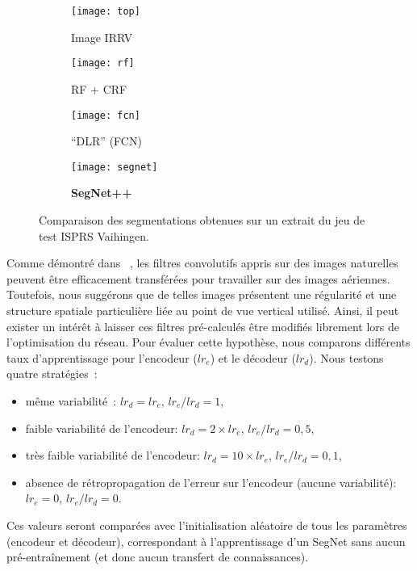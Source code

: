 \begin{figure}[t]
  \centering
  \captionsetup[subfigure]{singlelinecheck=off,justification=centering}
  \captionsetup[subfigure]{labelformat=empty}
  \begin{subfigure}[t]{0.19\textwidth}
    \texttt{[image: top]}
    \caption{Image IRRV}
  \end{subfigure}
    \begin{subfigure}[t]{0.19\textwidth}
    \texttt{[image: rf]}
    \caption{RF + CRF\cite{quang_efficient_2015}}
  \end{subfigure}
    \begin{subfigure}[t]{0.19\textwidth}
    \texttt{[image: fcn]}
    \caption{``DLR'' (FCN)\cite{marmanis_semantic_2016}}
  \end{subfigure}
    \begin{subfigure}[t]{0.19\textwidth}
    \texttt{[image: segnet]}
    \caption{\textbf{SegNet++}}
  \end{subfigure}
  \caption{Comparaison des segmentations obtenues sur un extrait du jeu de test ISPRS Vaihingen.\\
  \isprslegende}
  \label{fig_segnet_qualitative}
\end{figure}

Comme démontré dans ~\cite{penatti_deep_2015}, les filtres convolutifs appris sur des images naturelles peuvent être efficacement transférées pour travailler sur des images aériennes. Toutefois, nous suggérons que de telles images présentent une régularité et une structure spatiale particulière liée au point de vue vertical utilisé. Ainsi, il peut exister un intérêt à laisser ces filtres pré-calculés être modifiés librement lors de l'optimisation du réseau. Pour évaluer cette hypothèse, nous comparons différents taux d'apprentissage pour l'encodeur ($lr_{e}$) et le décodeur ($lr_{d}$). Nous testons quatre stratégies~:
\begin{itemize}
  \item même variabilité~: $lr_{d} = lr_{e}$, ${lr_{e} / lr_{d}} = 1$,
  \item faible variabilité de l'encodeur: $lr_{d} = 2 \times lr_{e}$, ${lr_{e} / lr_{d}} = 0,5$,
  \item très faible variabilité de l'encodeur: $lr_{d} = 10 \times lr_{e}$, ${lr_{e} / lr_{d}} = 0,1$,
  \item absence de rétropropagation de l'erreur sur l'encodeur (aucune variabilité): $lr_{e} = 0$, ${lr_{e} / lr_{d}} = 0$.
\end{itemize}
Ces valeurs seront comparées avec l'initialisation aléatoire de tous les paramètres (encodeur et décodeur), correspondant à l'apprentissage d'un SegNet sans aucun pré-entraînement (et donc aucun transfert de connaissances).

